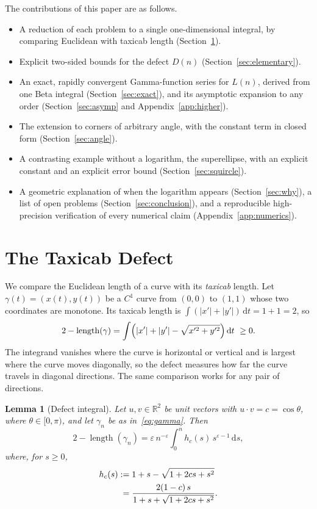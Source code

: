 \documentclass[journal]{IEEEtran}
\newtheorem{lemma}{Lemma}
\newcommand{\eps}{\varepsilon}
\newcommand{\dd}{\,\mathrm{d}}
\newcommand{\R}{\mathbb{R}}
\begin{document}
The contributions of this paper are as follows.
\begin{itemize}
\item A reduction of each problem to a single one-dimensional integral, by comparing
  Euclidean with taxicab length (Section~\ref{sec:defect}).
\item Explicit two-sided bounds for the defect $D(n)$ (Section~\ref{sec:elementary}).
\item An exact, rapidly convergent Gamma-function series for $L(n)$, derived from one Beta
  integral (Section~\ref{sec:exact}), and its asymptotic expansion to any order
  (Section~\ref{sec:asymp} and Appendix~\ref{app:higher}).
\item The extension to corners of arbitrary angle, with the constant term in closed form
  (Section~\ref{sec:angle}).
\item A contrasting example without a logarithm, the superellipse, with an explicit constant
  and an explicit error bound (Section~\ref{sec:squircle}).
\item A geometric explanation of when the logarithm appears (Section~\ref{sec:why}), a list of
  open problems (Section~\ref{sec:conclusion}), and a reproducible high-precision verification
  of every numerical claim (Appendix~\ref{app:numerics}).
\end{itemize}

\section{The Taxicab Defect}\label{sec:defect}

We compare the Euclidean length of a curve with its \emph{taxicab} length. Let
$\gamma(t)=(x(t),y(t))$ be a $C^1$ curve from $(0,0)$ to $(1,1)$ whose two coordinates are
monotone. Its taxicab length is $\int(|x'|+|y'|)\dd t=1+1=2$, so
\begin{equation}\label{eq:taxicab}
  2-\operatorname{length}(\gamma)=\int\Bigl(|x'|+|y'|-\sqrt{x'^2+y'^2}\Bigr)\dd t\ \ge0.
\end{equation}
The integrand vanishes where the curve is horizontal or vertical and is largest where the
curve moves diagonally, so the defect measures how far the curve travels in diagonal
directions. The same comparison works for any pair of directions.

\begin{lemma}[Defect integral]\label{lem:defect}
Let $u,v\in\R^2$ be unit vectors with $u\cdot v=c=\cos\theta$, where $\theta\in[0,\pi)$, and
let $\gamma_n$ be as in~\eqref{eq:gamma}. Then
\begin{equation}\label{eq:defect}
  2-\operatorname{length}(\gamma_n)=\eps\,n^{-\eps}\int_0^n h_c(s)\,s^{\eps-1}\dd s,
\end{equation}
where, for $s\ge0$,
\begin{align}
  h_c(s)&:=1+s-\sqrt{1+2cs+s^2}\notag\\
  &\phantom{:}=\frac{2(1-c)\,s}{1+s+\sqrt{1+2cs+s^2}}.\label{eq:hc}
\end{align}
\end{lemma}
\end{document}
